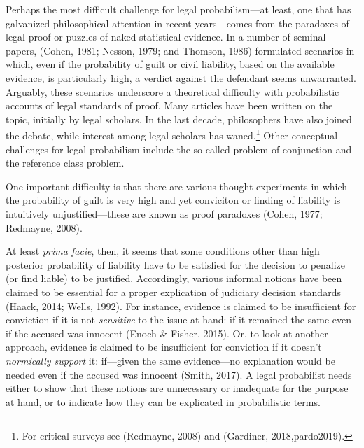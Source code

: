 \documentclass[11pt,dvipsnames,enabledeprecatedfontcommands]{scrartcl}
\begin{document}
Perhaps the most difficult challenge for legal probabilism---at least,
one that has galvanized philosophical attention in recent years---comes
from the paradoxes of legal proof or puzzles of naked statistical
evidence. In a number of seminal papers, (Cohen, 1981; Nesson, 1979; and
Thomson, 1986) formulated scenarios in which, even if the probability of
guilt or civil liability, based on the available evidence, is
particularly high, a verdict against the defendant seems unwarranted.
Arguably, these scenarios underscore a theoretical difficulty with
probabilistic accounts of legal standards of proof. Many articles have
been written on the topic, initially by legal scholars. In the last
decade, philosophers have also joined the debate, while interest among
legal scholars has waned.\footnote{For critical surveys see (Redmayne,
  2008) and (Gardiner, 2018,pardo2019).} Other conceptual challenges for
legal probabilism include the so-called problem of conjunction and the
reference class problem.

One important difficulty is that there are various thought experiments
in which the probability of guilt is very high and yet conviciton or
finding of liability is intuitively unjustified---these are known as
proof paradoxes (Cohen, 1977; Redmayne, 2008). 

At least \emph{prima facie}, then, it seems that some conditions other
than high posterior probability of liability have to be satisfied for
the decision to penalize (or find liable) to be justified. Accordingly,
various informal notions have been claimed to be essential for a proper
explication of judiciary decision standards (Haack, 2014; Wells, 1992).
For instance, evidence is claimed to be insufficient for conviction if
it is not \emph{sensitive} to the issue at hand: if it remained the same
even if the accused was innocent (Enoch \& Fisher, 2015). Or, to look at
another approach, evidence is claimed to be insufficient for conviction
if it doesn't \emph{normically support} it: if---given the same
evidence---no explanation would be needed even if the accused was
innocent (Smith, 2017). A legal probabilist needs either to show that
these notions are unnecessary or inadequate for the purpose at hand, or
to indicate how they can be explicated in probabilistic terms.

\end{document}
